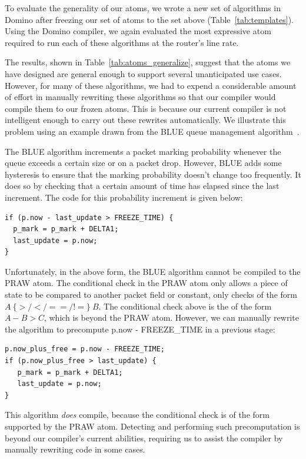 To evaluate the generality of our atoms, we wrote a new set of algorithms in
Domino after freezing our set of atoms to the set above
(Table~\ref{tab:templates}). Using the Domino compiler, we again evaluated the
most expressive atom required to run each of these algorithms at the router's
line rate.

The results, shown in Table~\ref{tab:atoms_generalize}, suggest that the atoms
we have designed are general enough to support several unanticipated use cases.
However, for many of these algorithms, we had to expend a considerable amount
of effort in manually rewriting these algorithms so that our compiler would
compile them to our frozen atoms. This is because our current compiler is not
intelligent enough to carry out these rewrites automatically. We illustrate
this problem using an example drawn from the BLUE queue management
algorithm~\cite{blue}.

The BLUE algorithm increments a packet marking probability whenever the queue
exceeds a certain size or on a packet drop. However, BLUE adds some hysteresis
to ensure that the marking probability doesn't change too frequently. It does
so by checking that a certain amount of time has elapsed since the last
increment.  The code for this probability increment is given below:

\begin{verbatim}
if (p.now - last_update > FREEZE_TIME) {
  p_mark = p_mark + DELTA1;
  last_update = p.now;
}
\end{verbatim}

Unfortunately, in the above form, the BLUE algorithm cannot be compiled to the
PRAW atom. The conditional check in the PRAW atom only allows a piece of state
to be compared to another packet field or constant, \ie only checks of the form
$A \ \{>/</==/!=\} \ B$. The conditional check above is the of the form $A - B
> C$, which is beyond the PRAW atom. However, we can manually rewrite the
algorithm to precompute p.now - FREEZE\_TIME in a previous stage:

\begin{verbatim}
p.now_plus_free = p.now - FREEZE_TIME;
if (p.now_plus_free > last_update) {
   p_mark = p_mark + DELTA1;
   last_update = p.now;
}
\end{verbatim}

This algorithm {\em does} compile, because the conditional check is of the form
supported by the PRAW atom. Detecting and performing such precomputation is
beyond our compiler's current abilities, requiring us to assist the compiler by
manually rewriting code in some cases. 

